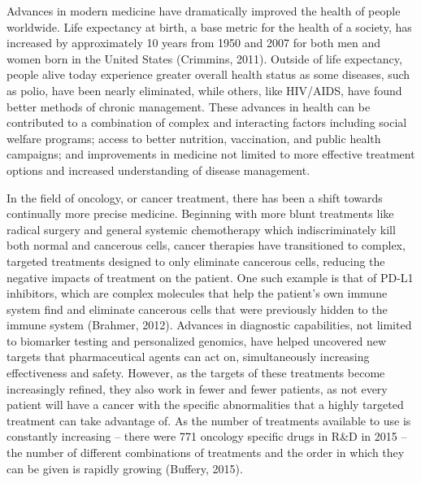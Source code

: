\documentclass[]{spie}  %
\begin{document}
Advances in modern medicine have dramatically improved the health of people worldwide. Life expectancy at birth, a base metric for the health of a society, has increased by approximately 10 years from 1950 and 2007 for both men and women born in the United States (Crimmins, 2011). Outside of life expectancy, people alive today experience greater overall health status as some diseases, such as polio, have been nearly eliminated, while others, like HIV/AIDS, have found better methods of chronic management. These advances in health can be contributed to a combination of complex and interacting factors including social welfare programs; access to better nutrition, vaccination, and public health campaigns; and improvements in medicine not limited to more effective treatment options and increased understanding of disease management.

In the field of oncology, or cancer treatment, there has been a shift towards continually more precise medicine. Beginning with more blunt treatments like radical surgery and general systemic chemotherapy which indiscriminately kill both normal and cancerous cells, cancer therapies have transitioned to complex, targeted treatments designed to only eliminate cancerous cells, reducing the negative impacts of treatment on the patient. One such example is that of PD-L1 inhibitors, which are complex molecules that help the patient’s own immune system find and eliminate cancerous cells that were previously hidden to the immune system (Brahmer, 2012). Advances in diagnostic capabilities, not limited to biomarker testing and personalized genomics, have helped uncovered new targets that pharmaceutical agents can act on, simultaneously increasing effectiveness and safety. However, as the targets of these treatments become increasingly refined, they also work in fewer and fewer patients, as not every patient will have a cancer with the specific abnormalities that a highly targeted treatment can take advantage of. As the number of treatments available to use is constantly increasing -- there were 771 oncology specific drugs in R\&D in 2015 -- the number of different combinations of treatments and the order in which they can be given is rapidly growing (Buffery, 2015).
\end{document}
